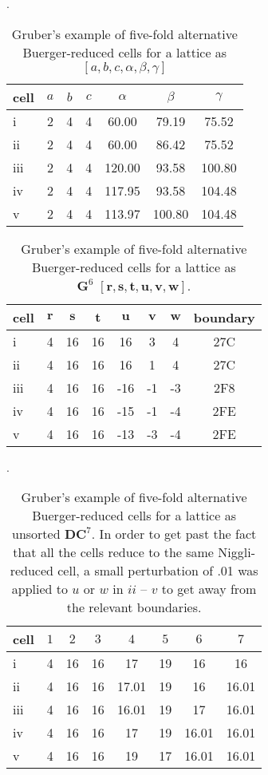 \documentclass[preprint]{iucr}              %
\begin{document}
{\begin{table}
\caption{Gruber's example of five-fold alternative Buerger-reduced
cells for a lattice as $[a,b,c,\alpha,\beta,\gamma]$}.
\label{table::grubercells}
\begin{center}
\begin{tabular}{|l|cccccc|}
\hline
cell&$a$&$b$&$c$&$\alpha$&$\beta$&$\gamma$\\
\hline
i&2&4&4&60.00&79.19&75.52\\
ii&2&4&4&60.00&86.42&75.52\\
iii&2&4&4&120.00&93.58&100.80\\
iv&2&4&4&117.95&93.58&104.48\\
v&2&4&4&113.97&100.80&104.48\\
\hline
\end{tabular}
\end{center}
\end{table}

\begin{table}
\caption{Gruber's example of five-fold alternative Buerger-reduced
cells for a lattice as\\
$\mathbf{G}^6$ $[\textbf{r},\textbf{s},\textbf{t},\textbf{u},\textbf{v},\textbf{w}]$.}
\label{table::gruberg6cells}
\begin{center}
\begin{tabular}{|l|cccccc|c|}
\hline
\textbf{cell}&$\textbf{r}$&$\textbf{s}$&$\textbf{t}$&$\textbf{u}$&$\textbf{v}$&$\textbf{w}$&\textbf{boundary}\\
\hline
i&4&16&16&16&3&4&27C\\      
ii&4&16&16&16&1&4&27C\\      
iii&4&16&16&-16&-1&-3&2F8\\      
iv&4&16&16&-15&-1&-4&2FE\\    
v&4&16&16&-13&-3&-4&2FE\\      
\hline
\end{tabular}
\end{center}
\end{table}

\begin{table}
\caption{Gruber's example of five-fold alternative Buerger-reduced
cells for a lattice as unsorted $\mathbf{DC}^7$.  In order to get
past the fact that all the cells reduce to the same Niggli-reduced cell,
a small perturbation of .01 was applied to $u$ or $w$ in
$ii$ -- $v$ to
get away from the relevant boundaries.}.
\label{table::gruberdc7unsrt}
\begin{center}
\begin{tabular}{|l|ccc|ccc|c|}
\hline
cell&$1$&$2$&$3$&$4$&$5$&$6$&$7$\\
\hline
i&4&16&16&17&19&16&16\\
ii&4&16&16&17.01&19&16&16.01\\
iii&4&16&16&16.01&19&17&16.01\\
iv&4&16&16&17&19&16.01&16.01\\
v&4&16&16&19&17&16.01&16.01\\
\hline
\end{tabular}
\end{center}
\end{table}



}
\end{document}

